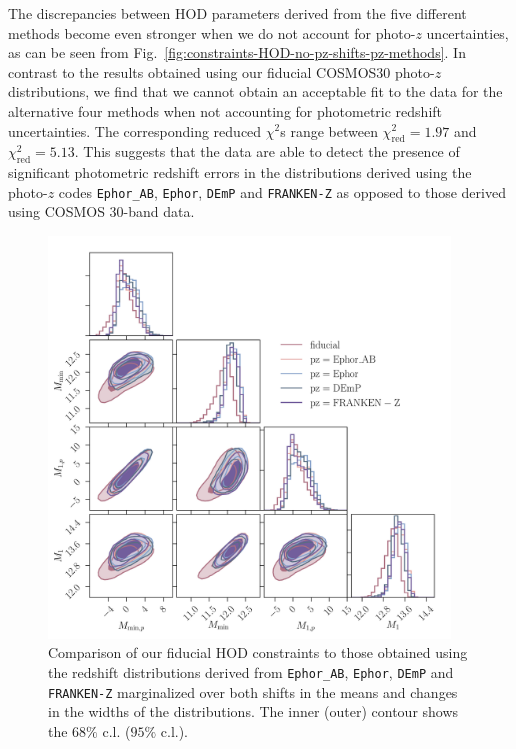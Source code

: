 \documentclass[a4paper,11pt]{article}
\begin{document}
The discrepancies between HOD parameters derived from the five different methods become even stronger when we do not account for photo-$z$ uncertainties, as can be seen from Fig.~\ref{fig:constraints-HOD-no-pz-shifts-pz-methods}. In contrast to the results obtained using our fiducial COSMOS30 photo-$z$ distributions, we find that we cannot obtain an acceptable fit to the data for the alternative four methods when not accounting for photometric redshift uncertainties. The corresponding reduced $\chi^{2}$s range between $\chi^{2}_{\mathrm{red}} = 1.97$ and $\chi^{2}_{\mathrm{red}} = 5.13$. This suggests that the data are able to detect the presence of significant photometric redshift errors in the distributions derived using the photo-$z$ codes \texttt{Ephor\_AB}, \texttt{Ephor}, \texttt{DEmP} and \texttt{FRANKEN-Z} as opposed to those derived using COSMOS 30-band data.

\begin{figure}
\begin{center}
\includegraphics[width=0.95\textwidth]{figures/contours-Mmin-M1_mPk=HOD_fix=alpha-fc-sigmaM_HOD=zevol_fit=pz-shifts-pz-widths+prior=0p2_fit=auto+cross_cosmo=const_HOD-param=zfid_clfit=HOD-zevol_pz-methods.pdf}
\caption{Comparison of our fiducial HOD constraints to those obtained using the redshift distributions derived from \texttt{Ephor\_AB}, \texttt{Ephor}, \texttt{DEmP} and \texttt{FRANKEN-Z} marginalized over both shifts in the means and changes in the widths of the distributions. The inner (outer) contour shows the $68 \%$ c.l. ($95 \%$ c.l.).}
\label{fig:constraints-HOD-fit-pz-shifts+pz-widths-pz-methods}
\end{center}
\end{figure}
 
\end{document}
